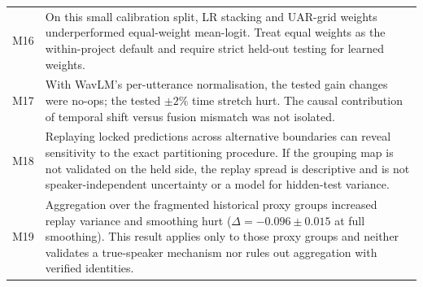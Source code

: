\begin{table}[t]
\begin{tabular}{lp{}}
M16 & On this small calibration split, LR stacking and UAR-grid weights underperformed equal-weight mean-logit. Treat equal weights as the within-project default and require strict held-out testing for learned weights. \\
M17 & With WavLM's per-utterance normalisation, the tested gain changes were no-ops; the tested $\pm2\%$ time stretch hurt. The causal contribution of temporal shift versus fusion mismatch was not isolated. \\
\midrule
M18 & Replaying locked predictions across alternative boundaries can reveal sensitivity to the exact partitioning procedure. If the grouping map is not validated on the held side, the replay spread is descriptive and is not speaker-independent uncertainty or a model for hidden-test variance. \\
\midrule
M19 & Aggregation over the fragmented historical proxy groups increased replay variance and smoothing hurt ($\Delta=-0.096\pm0.015$ at full smoothing). This result applies only to those proxy groups and neither validates a true-speaker mechanism nor rules out aggregation with verified identities. \\
\bottomrule
\end{tabular}
\end{table}
